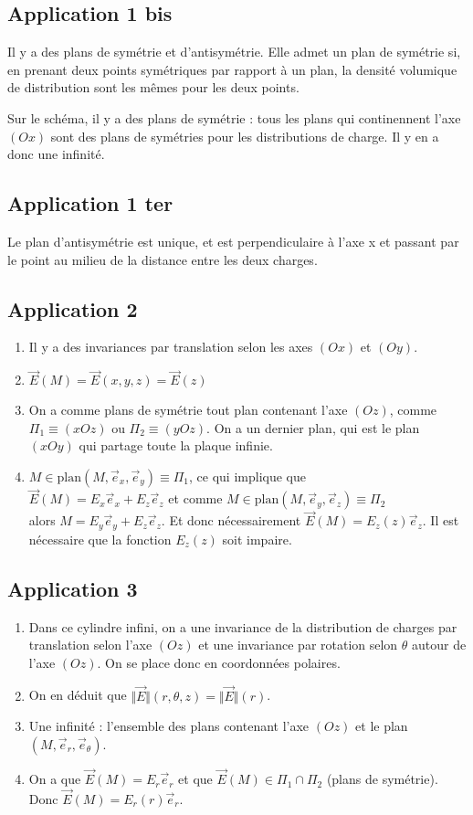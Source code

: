 \documentclass[a4paper,12pt]{book}
\begin{document}
\subsection{Application 1 bis}
Il y a des plans de symétrie et d'antisymétrie. Elle admet un plan de symétrie si, en prenant deux points symétriques par rapport à un plan, la densité volumique de distribution sont les mêmes pour les deux points.
\par Sur le schéma, il y a des plans de symétrie : tous les plans qui continennent l'axe $(Ox)$ sont des plans de symétries pour les distributions de charge. Il y en a donc une infinité.

\subsection{Application 1 ter}
Le plan d'antisymétrie est unique, et est perpendiculaire à l'axe x et passant par le point au milieu de la distance entre les deux charges.

\subsection{Application 2}
\begin{enumerate}
\item Il y a des invariances par translation selon les axes $(Ox)$ et $(Oy)$.
\item $\vec{E}(M) = \vec{E}(x,y,z) = \vec{E}(z)$
\item On a comme plans de symétrie tout plan contenant l'axe $(Oz)$, comme $\Pi_1 \equiv (xOz)$ ou $\Pi_2 \equiv (yOz)$. On a un dernier plan, qui est le plan $(xOy)$ qui partage toute la plaque infinie.
\item $M\in \mathrm{plan}(M, \vec{e}_x, \vec{e}_y)\equiv \Pi_1$, ce qui implique que
\\ $\vec{E}(M) = E_x\vec{e}_x + E_z\vec{e}_z$ et comme $M\in\mathrm{plan}(M,\vec{e}_y, \vec{e}_z)\equiv \Pi_2$
\\ alors $M = E_y\vec{e}_y + E_z\vec{e}_z$. Et donc nécessairement $\vec{E}(M) = E_z(z)\vec{e}_z$. Il est nécessaire que la fonction $E_z(z)$ soit impaire.
\end{enumerate}


\subsection{Application 3}
\begin{enumerate}
\item Dans ce cylindre infini, on a une invariance de la distribution de charges par translation selon l'axe $(Oz)$ et une invariance par rotation selon $\theta$ autour de l'axe $(Oz)$. On se place donc en coordonnées polaires.
\item On en déduit que $\Vert\vec{E}\Vert(r,\theta,z) = \Vert\vec{E}\Vert(r)$.
\item Une infinité : l'ensemble des plans contenant l'axe $(Oz)$ et le plan $(M, \vec{e}_r,\vec{e}_\theta)$.
\item On a que $\vec{E}(M) = E_r\vec{e}_r$ et que $\vec{E}(M)\in\Pi_1\cap\Pi_2$ (plans de symétrie). Donc $\vec{E}(M) = E_r(r)\vec{e}_r$.
\end{enumerate}
\end{document}
